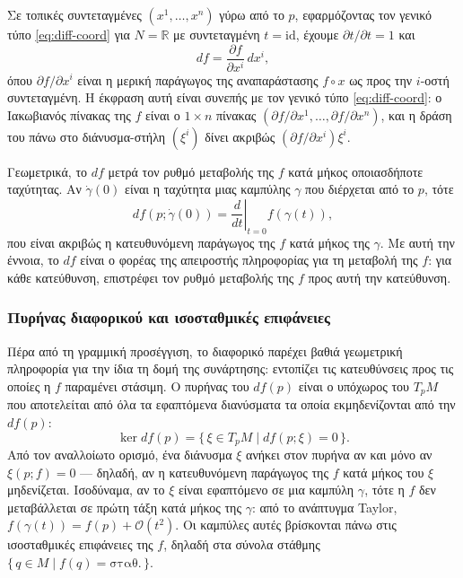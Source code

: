 \documentclass[11pt,a4paper,twoside,openright]{book}
\begin{document}
Σε τοπικές συντεταγμένες $(x^1, \dots, x^n)$ γύρω από το $p$, εφαρμόζοντας τον γενικό τύπο \eqref{eq:diff-coord} για $N = \mathbb{R}$ με συντεταγμένη $t = \mathrm{id}$, έχουμε $\partial t / \partial t = 1$ και
\begin{equation}
df = \frac{\partial f}{\partial x^i} \, dx^i,
\end{equation}
όπου $\partial f / \partial x^i$ είναι η μερική παράγωγος της αναπαράστασης $f \circ x$ ως προς την $i$-οστή συντεταγμένη. Η έκφραση αυτή είναι συνεπής με τον γενικό τύπο \eqref{eq:diff-coord}: ο Ιακωβιανός πίνακας της $f$ είναι ο $1 \times n$ πίνακας $(\partial f / \partial x^1, \dots, \partial f / \partial x^n)$, και η δράση του πάνω στο διάνυσμα-στήλη $(\xi^i)$ δίνει ακριβώς $(\partial f / \partial x^i) \xi^i$.

Γεωμετρικά, το $df$ μετρά τον ρυθμό μεταβολής της $f$ κατά μήκος οποιασδήποτε ταχύτητας. Αν $\dot{\gamma}(0)$ είναι η ταχύτητα μιας καμπύλης $\gamma$ που διέρχεται από το $p$, τότε
\begin{equation}
df(p; \dot{\gamma}(0)) = \left. \frac{d}{dt} \right|_{t=0} f(\gamma(t)),
\end{equation}
που είναι ακριβώς η κατευθυνόμενη παράγωγος της $f$ κατά μήκος της $\gamma$. Με αυτή την έννοια, το $df$ είναι ο φορέας της απειροστής πληροφορίας για τη μεταβολή της $f$: για κάθε κατεύθυνση, επιστρέφει τον ρυθμό μεταβολής της $f$ προς αυτή την κατεύθυνση.

\subsubsection{Πυρήνας διαφορικού και ισοσταθμικές επιφάνειες}

Πέρα από τη γραμμική προσέγγιση, το διαφορικό παρέχει βαθιά γεωμετρική πληροφορία για την ίδια τη δομή της συνάρτησης: εντοπίζει τις κατευθύνσεις προς τις οποίες η $f$ παραμένει στάσιμη. Ο πυρήνας του $df(p)$ είναι ο υπόχωρος του $T_pM$ που αποτελείται από όλα τα εφαπτόμενα διανύσματα τα οποία εκμηδενίζονται από την $df(p)$:
\begin{equation}
\ker df(p) = \{\, \xi \in T_pM \mid df(p; \xi) = 0 \,\}.
\end{equation}
Από τον αναλλοίωτο ορισμό, ένα διάνυσμα $\xi$ ανήκει στον πυρήνα αν και μόνο αν $\xi(p; f) = 0$ --- δηλαδή, αν η κατευθυνόμενη παράγωγος της $f$ κατά μήκος του $\xi$ μηδενίζεται. Ισοδύναμα, αν το $\xi$ είναι εφαπτόμενο σε μια καμπύλη $\gamma$, τότε η $f$ δεν μεταβάλλεται σε πρώτη τάξη κατά μήκος της $\gamma$: από το ανάπτυγμα Taylor, $f(\gamma(t)) = f(p) + \mathcal{O}(t^2)$. Οι καμπύλες αυτές βρίσκονται πάνω στις ισοσταθμικές επιφάνειες της $f$, δηλαδή στα σύνολα στάθμης $\{\, q \in M \mid f(q) = \text{σταθ.} \,\}$.
\end{document}
